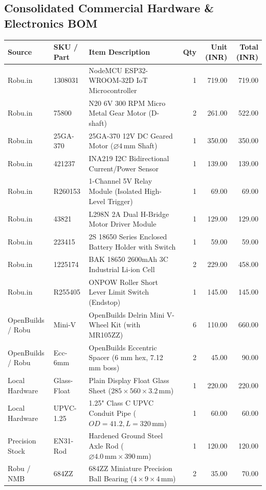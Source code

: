 \documentclass[10pt,a4paper]{article}
\begin{document}
\subsection{Consolidated Commercial Hardware \& Electronics BOM}
\begin{table}[H]
\centering
\small
\begin{tabularx}{\textwidth}{l l p{6.0cm} r r r}
\toprule
\textbf{Source} & \textbf{SKU / Part} & \textbf{Item Description} & \textbf{Qty} & \textbf{Unit (INR)} & \textbf{Total (INR)} \\
\midrule
Robu.in & 1308031 & NodeMCU ESP32-WROOM-32D IoT Microcontroller & 1 & 719.00 & 719.00 \\
Robu.in & 75800 & N20 6V 300 RPM Micro Metal Gear Motor (D-shaft) & 2 & 261.00 & 522.00 \\
Robu.in & 25GA-370 & 25GA-370 12V DC Geared Motor ($\varnothing 4\,\text{mm}$ Shaft) & 1 & 350.00 & 350.00 \\
Robu.in & 421237 & INA219 I2C Bidirectional Current/Power Sensor & 1 & 139.00 & 139.00 \\
Robu.in & R260153 & 1-Channel 5V Relay Module (Isolated High-Level Trigger) & 1 & 69.00 & 69.00 \\
Robu.in & 43821 & L298N 2A Dual H-Bridge Motor Driver Module & 1 & 129.00 & 129.00 \\
Robu.in & 223415 & 2S 18650 Series Enclosed Battery Holder with Switch & 1 & 59.00 & 59.00 \\
Robu.in & 1225174 & BAK 18650 2600mAh 3C Industrial Li-ion Cell & 2 & 229.00 & 458.00 \\
Robu.in & R255405 & ONPOW Roller Short Lever Limit Switch (Endstop) & 1 & 145.00 & 145.00 \\
OpenBuilds / Robu & Mini-V & OpenBuilds Delrin Mini V-Wheel Kit (with MR105ZZ) & 6 & 110.00 & 660.00 \\
OpenBuilds / Robu & Ecc-6mm & OpenBuilds Eccentric Spacer (6 mm hex, 7.12 mm boss) & 2 & 45.00 & 90.00 \\
Local Hardware & Glass-Float & Plain Display Float Glass Sheet ($285 \times 560 \times 3.2\,\text{mm}$) & 1 & 220.00 & 220.00 \\
Local Hardware & UPVC-1.25 & 1.25" Class C UPVC Conduit Pipe ($OD=41.2, L=320\,\text{mm}$) & 1 & 60.00 & 60.00 \\
Precision Stock & EN31-Rod & Hardened Ground Steel Axle Rod ($\varnothing 4.0\,\text{mm} \times 390\,\text{mm}$) & 1 & 120.00 & 120.00 \\
Robu / NMB & 684ZZ & 684ZZ Miniature Precision Ball Bearing ($4 \times 9 \times 4\,\text{mm}$) & 2 & 35.00 & 70.00 \\

\end{tabularx}
\end{table}
\end{document}
